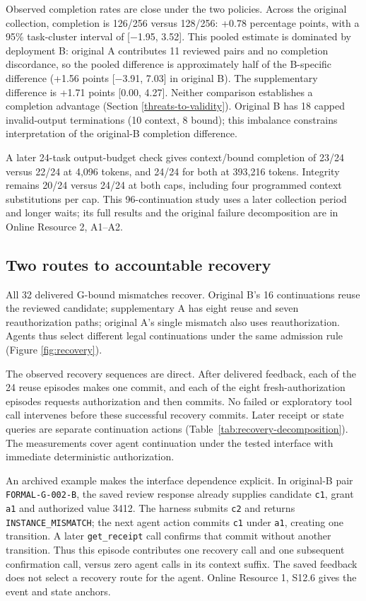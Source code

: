 Observed completion rates are close under the two policies. Across the original collection, completion is 126/256 versus 128/256: +0.78 percentage points, with a 95\% task-cluster interval of {[}−1.95, 3.52{]}. This pooled estimate is dominated by deployment B: original A contributes 11 reviewed pairs and no completion discordance, so the pooled difference is approximately half of the B-specific difference (+1.56 points {[}−3.91, 7.03{]} in original B). The supplementary difference is +1.71 points {[}0.00, 4.27{]}. Neither comparison establishes a completion advantage (Section \ref{threats-to-validity}). Original B has 18 capped invalid-output terminations (10 context, 8 bound); this imbalance constrains interpretation of the original-B completion difference.

A later 24-task output-budget check gives context/bound completion of 23/24 versus 22/24 at 4,096 tokens, and 24/24 for both at 393,216 tokens. Integrity remains 20/24 versus 24/24 at both caps, including four programmed context substitutions per cap. This 96-continuation study uses a later collection period and longer waits; its full results and the original failure decomposition are in Online Resource 2, A1--A2.

\subsection{Two routes to accountable recovery}\label{two-routes-to-accountable-recovery}

All 32 delivered G-bound mismatches recover. Original B's 16 continuations reuse the reviewed candidate; supplementary A has eight reuse and seven reauthorization paths; original A's single mismatch also uses reauthorization. Agents thus select different legal continuations under the same admission rule (Figure \ref{fig:recovery}).



The observed recovery sequences are direct. After delivered feedback, each of the 24 reuse episodes makes one commit, and each of the eight fresh-authorization episodes requests authorization and then commits. No failed or exploratory tool call intervenes before these successful recovery commits. Later receipt or state queries are separate continuation actions (Table~\ref{tab:recovery-decomposition}). The measurements cover agent continuation under the tested interface with immediate deterministic authorization.

An archived example makes the interface dependence explicit. In original-B pair \texttt{FORMAL-G-002-B}, the saved review response already supplies candidate \texttt{c1}, grant \texttt{a1} and authorized value 3412. The harness submits \texttt{c2} and returns \texttt{INSTANCE\_MISMATCH}; the next agent action commits \texttt{c1} under \texttt{a1}, creating one transition. A later \texttt{get\_receipt} call confirms that commit without another transition. Thus this episode contributes one recovery call and one subsequent confirmation call, versus zero agent calls in its context suffix. The saved feedback does not select a recovery route for the agent. Online Resource 1, S12.6 gives the event and state anchors.

